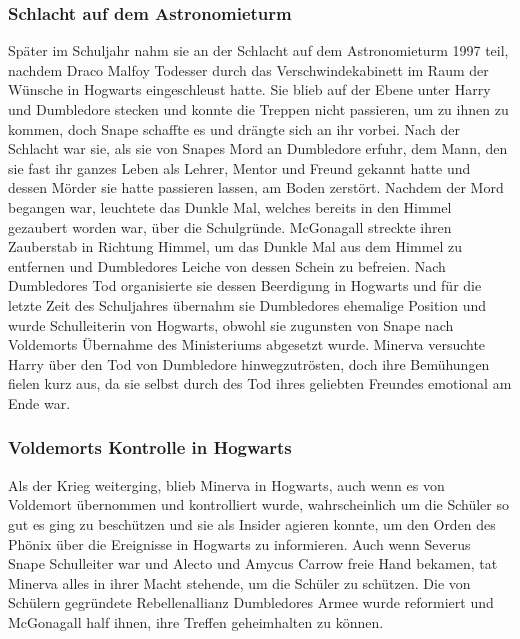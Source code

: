 \documentclass[a4paper, 10pt]{article}
\begin{document}
\subsubsection*{\large Schlacht auf dem Astronomieturm}
Später im Schuljahr nahm sie an der Schlacht auf dem Astronomieturm 1997 teil, nachdem Draco Malfoy Todesser durch das Verschwindekabinett im Raum der Wünsche in Hogwarts eingeschleust hatte. Sie blieb auf der Ebene unter Harry und Dumbledore stecken und konnte die Treppen nicht passieren, um zu ihnen zu kommen, doch Snape schaffte es und drängte sich an ihr vorbei.
\vspace{10pt}
\newline
{}  
Nach der Schlacht war sie, als sie von Snapes Mord an Dumbledore erfuhr, dem Mann, den sie fast ihr ganzes Leben als Lehrer, Mentor und Freund gekannt hatte und dessen Mörder sie hatte passieren lassen, am Boden zerstört. Nachdem der Mord begangen war, leuchtete das Dunkle Mal, welches bereits in den Himmel gezaubert worden war, über die Schulgründe. McGonagall streckte ihren Zauberstab in Richtung Himmel, um das Dunkle Mal aus dem Himmel zu entfernen und Dumbledores Leiche von dessen Schein zu befreien. Nach Dumbledores Tod organisierte sie dessen Beerdigung in Hogwarts und für die letzte Zeit des Schuljahres übernahm sie Dumbledores ehemalige Position und wurde Schulleiterin von Hogwarts, obwohl sie zugunsten von Snape nach Voldemorts Übernahme des Ministeriums abgesetzt wurde. Minerva versuchte Harry über den Tod von Dumbledore hinwegzutrösten, doch ihre Bemühungen fielen kurz aus, da sie selbst durch des Tod ihres geliebten Freundes emotional am Ende war.
\subsubsection*{\large Voldemorts Kontrolle in Hogwarts}
Als der Krieg weiterging, blieb Minerva in Hogwarts, auch wenn es von Voldemort übernommen und kontrolliert wurde, wahrscheinlich um die Schüler so gut es ging zu beschützen und sie als Insider agieren konnte, um den Orden des Phönix über die Ereignisse in Hogwarts zu informieren. Auch wenn Severus Snape Schulleiter war und Alecto und Amycus Carrow freie Hand bekamen, tat Minerva alles in ihrer Macht stehende, um die Schüler zu schützen. Die von Schülern gegründete Rebellenallianz Dumbledores Armee wurde reformiert und McGonagall half ihnen, ihre Treffen geheimhalten zu können.
\end{document}

